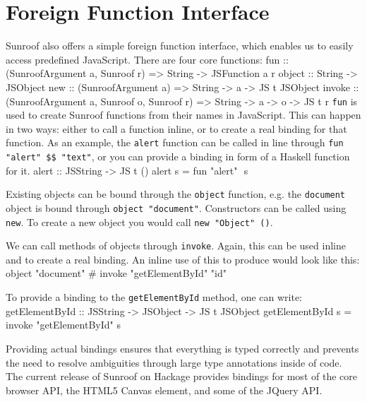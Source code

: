\documentclass{llncs}
\newcommand{\Src}[1]{{\tt{#1}}}
\newenvironment{Code}{\verbatim}{\endverbatim}
\begin{document}
\section{Foreign Function Interface}
\label{sec:ffi}

Sunroof also offers a simple foreign function interface, 
which enables us to easily 
access predefined JavaScript. There are four core functions:
\begin{Code}
fun    :: (SunroofArgument a, Sunroof r) 
       => String -> JSFunction a r
object :: String -> JSObject
new    :: (SunroofArgument a) 
       => String -> a -> JS t JSObject
invoke :: (SunroofArgument a, Sunroof o, Sunroof r) 
       => String -> a -> o -> JS t r
\end{Code}
\Src{fun} is used to create Sunroof functions from their names in JavaScript.
This can happen in two ways: either to call a function inline, or to 
create a real binding for that function. As an example, 
the \Src{alert} function can be called in line through \Src{fun "alert" \$\$ "text"},
or you can provide a binding in form of a Haskell function for it.
\begin{Code}
alert :: JSString -> JS t ()
alert s = fun "alert" $$ s
\end{Code}

Existing objects can be bound through the \Src{object} function, e.g.
the \Src{document} object is bound through \Src{object "document"}.
Constructors can be called using \Src{new}. To create a new
object you would call \Src{new "Object" ()}.

We can call methods of objects through \Src{invoke}. Again, this 
can be used inline and to create a real binding. An inline 
use of this to produce \linebreak\Src{document.getElementById("id")} would look like this: 
\begin{Code}
  object "document" # invoke "getElementById" "id"
\end{Code}

To provide a binding 
to the \Src{getElementById} method, one can write:
\begin{Code}
getElementById :: JSString -> JSObject -> JS t JSObject
getElementById s = invoke "getElementById" s
\end{Code}

Providing actual bindings ensures that
everything is typed correctly and prevents the need to resolve ambiguities 
through large type annotations inside of code.
%
The current release of Sunroof on Hackage provides bindings for most of the 
core browser API, the HTML5 Canvas element, and some of the JQuery API.
\end{document}
